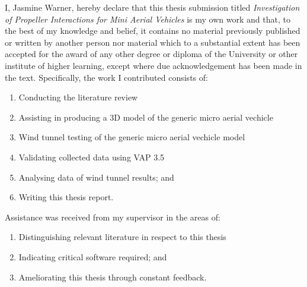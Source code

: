 
\begin{declaration}
I, Jasmine Warner, hereby declare that this thesis submission titled \emph{Investigation of Propeller Interactions for Mini Aerial Vehicles} is my own work and that, to the best of my knowledge and belief, it contains no material previously published or written by another person nor material which to a substantial extent has been accepted for the award of any other degree or diploma of the University or other institute of higher learning, except where due acknowledgement has been made in the text.  Specifically, the work I contributed consists of:

\vspace{-1em}

\begin{enumerate}
    \item Conducting the literature review
    \item Assisting in producing a 3D model of the generic micro aerial vechicle
    \item Wind tunnel testing of the generic micro aerial vechicle model
    \item Validating collected data using VAP 3.5
    \item Analysing data of wind tunnel results; and
    \item Writing this thesis report.
\end{enumerate}

\vspace{-1em}

Assistance was received from my supervisor in the areas of:

\vspace{-1em}

\begin{enumerate}
    \item Distinguishing relevant literature in respect to this thesis
    \item Indicating critical software required; and
    \item Ameliorating this thesis through constant feedback.
\end{enumerate}

\vspace{0.5cm}


\end{declaration}
